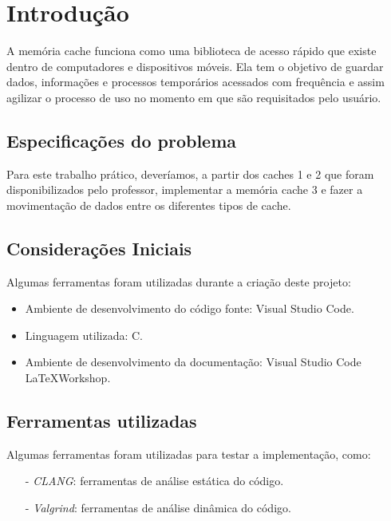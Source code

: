\documentclass{article}
\begin{document}



\section{Introdução}
A memória cache funciona como uma biblioteca de acesso rápido que existe dentro de computadores e dispositivos móveis. Ela tem o objetivo de guardar dados, informações e processos temporários acessados com frequência e assim agilizar o processo de uso no momento em que são requisitados pelo usuário.

\subsection{Especificações do problema}

Para este trabalho prático, deveríamos, a partir dos caches 1 e 2 que foram disponibilizados pelo professor, implementar a memória cache 3 e fazer a movimentação de dados entre os diferentes tipos de cache.
\subsection{Considerações Iniciais}
Algumas ferramentas foram utilizadas durante a criação deste projeto:

\begin{itemize}
  \item Ambiente de desenvolvimento do código fonte: Visual Studio Code.
  \item Linguagem utilizada: C.
  \item Ambiente de desenvolvimento da documentação: Visual Studio Code \LaTeX Workshop.
\end{itemize}

\subsection{Ferramentas utilizadas}
Algumas ferramentas foram utilizadas para testar a implementação, como:

\begin{itemize}
    \item[-] \textit{CLANG}: ferramentas de análise estática do código.
    \item[-] \textit{Valgrind}: ferramentas de análise dinâmica do código.
\end{itemize}
\end{document}
